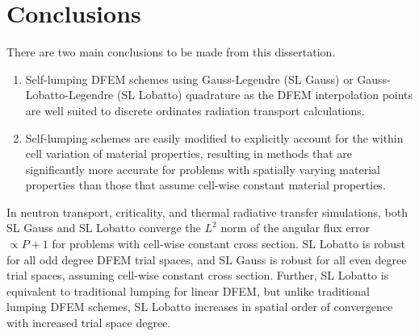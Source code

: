 \section{Conclusions}

There are two main conclusions to be made from this dissertation.
\begin{enumerate}
\item Self-lumping DFEM schemes using Gauss-Legendre (SL Gauss) or Gauss-Lobatto-Legendre (SL Lobatto) quadrature as the DFEM interpolation points are well suited to discrete ordinates radiation transport calculations.
\item Self-lumping schemes are easily modified to explicitly account for the within cell variation of material properties, resulting in methods that are significantly more accurate for problems with spatially varying material properties than those that assume cell-wise constant material properties.
\end{enumerate}

In neutron transport, criticality, and thermal radiative transfer simulations, both SL Gauss and SL Lobatto converge the $L^2$ norm of the angular flux error $\propto P+1$ for problems with cell-wise constant cross section.
SL Lobatto is robust for all odd degree DFEM trial spaces, and SL Gauss is robust for all even degree trial spaces, assuming cell-wise constant cross section.
Further, SL Lobatto is equivalent to traditional lumping for linear DFEM, but unlike traditional lumping DFEM schemes, SL Lobatto increases in spatial order of convergence with increased trial space degree.

